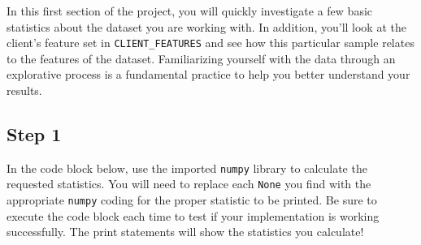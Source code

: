 \documentclass{article}
\begin{document}
In this first section of the project, you will quickly investigate a few
basic statistics about the dataset you are working with. In addition,
you'll look at the client's feature set in \texttt{CLIENT\_FEATURES} and
see how this particular sample relates to the features of the dataset.
Familiarizing yourself with the data through an explorative process is a
fundamental practice to help you better understand your results.

    \subsection{Step 1}\label{step-1}

In the code block below, use the imported \texttt{numpy} library to
calculate the requested statistics. You will need to replace each
\texttt{None} you find with the appropriate \texttt{numpy} coding for
the proper statistic to be printed. Be sure to execute the code block
each time to test if your implementation is working successfully. The
print statements will show the statistics you calculate!
\end{document}
